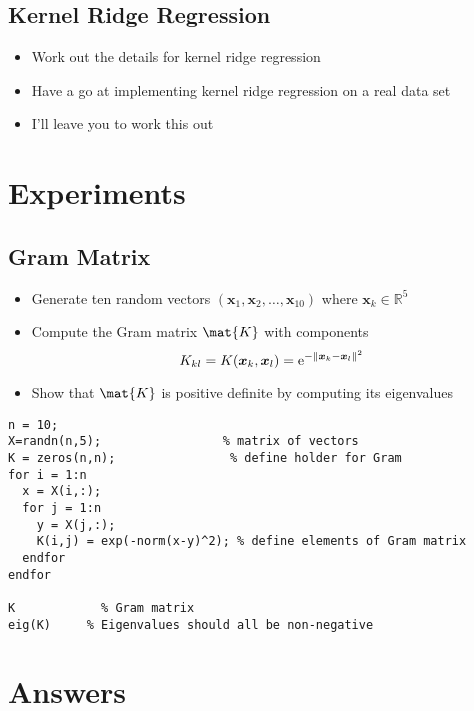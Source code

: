 \documentclass[11pt]{article}
\newcommand{\e}[1]{{\rm e}^{#1}}
\begin{document}
\subsection{Kernel Ridge Regression}
\label{sec:orgf9d723d}
\begin{itemize}
\item Work out the details for kernel ridge regression
\item Have a go at implementing kernel ridge regression on a real data set
\item I'll leave you to work this out
\end{itemize}

\section{Experiments}
\label{sec:orgce1bc6f}

\subsection{Gram Matrix}
\label{sec:orgb125902}
\begin{itemize}
\item Generate ten random vectors \((\bm{x}_1,\bm{x}_2, \ldots,
     \bm{x}_{10})\) where \(\bm{x}_k \in \mathbb{R}^5\)
\item Compute the Gram matrix \(\mat{K}\) with components
$$ K_{kl} = K(\bm{x}_k,\bm{x}_l) = \e{-\|\bm{x}_k-\bm{x}_l\|^2} $$
\item Show that \(\mat{K}\) is positive definite by computing its
eigenvalues
\end{itemize}
\begin{verbatim}
n = 10;
X=randn(n,5);                 % matrix of vectors
K = zeros(n,n);                % define holder for Gram
for i = 1:n
  x = X(i,:);
  for j = 1:n
    y = X(j,:);
    K(i,j) = exp(-norm(x-y)^2); % define elements of Gram matrix
  endfor
endfor

K            % Gram matrix
eig(K)     % Eigenvalues should all be non-negative
\end{verbatim}

\section{Answers}
\label{sec:org4f9a6a5}
\end{document}
